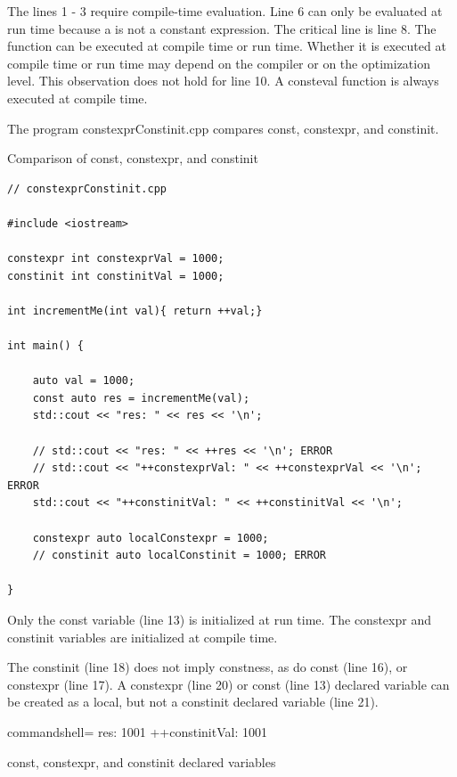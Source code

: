 The lines 1 - 3 require compile-time evaluation. Line 6 can only be evaluated at run time because a is not a constant expression. The critical line is line 8. The function can be executed at compile time or run time. Whether it is executed at compile time or run time may depend on the compiler or on the optimization level. This observation does not hold for line 10. A consteval function is always executed at compile time.


The program constexprConstinit.cpp compares const, constexpr, and constinit.

\noindent
Comparison of const, constexpr, and constinit
\begin{lstlisting}[style=styleCXX]
// constexprConstinit.cpp

#include <iostream>

constexpr int constexprVal = 1000;
constinit int constinitVal = 1000;

int incrementMe(int val){ return ++val;}

int main() {
	
	auto val = 1000;
	const auto res = incrementMe(val);
	std::cout << "res: " << res << '\n';
	
	// std::cout << "res: " << ++res << '\n'; ERROR
	// std::cout << "++constexprVal: " << ++constexprVal << '\n'; ERROR
	std::cout << "++constinitVal: " << ++constinitVal << '\n';
	
	constexpr auto localConstexpr = 1000;
	// constinit auto localConstinit = 1000; ERROR

}
\end{lstlisting}

Only the const variable (line 13) is initialized at run time. The constexpr and constinit variables are initialized at compile time.

The constinit (line 18) does not imply constness, as do const (line 16), or constexpr (line 17). A constexpr (line 20) or const (line 13) declared variable can be created as a local, but not a constinit declared variable (line 21).

\begin{tcblisting}{commandshell={}}
res: 1001
++constinitVal: 1001
\end{tcblisting}

\begin{center}
const, constexpr, and constinit declared variables
\end{center}

